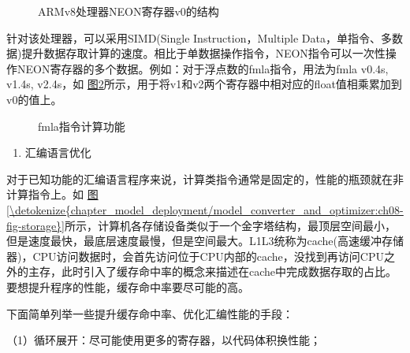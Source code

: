 \documentclass[letterpaper,10pt,english]{sphinxmanual}
\let\sphinxpxdimen\pdfpxdimen\else\newdimen\sphinxpxdimen
\begin{document}
\begin{figure}[H]
\centering
\capstart

\noindent\sphinxincludegraphics[width=500\sphinxpxdimen]{{register}.png}
\caption{ARMv8处理器NEON寄存器v0的结构}\label{\detokenize{chapter_model_deployment/model_inference:id10}}\label{\detokenize{chapter_model_deployment/model_inference:ch08-fig-register}}\end{figure}

\sphinxAtStartPar
针对该处理器，可以采用SIMD(Single Instruction，Multiple
Data，单指令、多数据)提升数据存取计算的速度。相比于单数据操作指令，NEON指令可以一次性操作NEON寄存器的多个数据。例如：对于浮点数的fmla指令，用法为fmla
v0.4s, v1.4s, v2.4s，如
\hyperref[\detokenize{chapter_model_deployment/model_inference:ch08-fig-fmla}]{图\ref{\detokenize{chapter_model_deployment/model_inference:ch08-fig-fmla}}}所示，用于将v1和v2两个寄存器中相对应的float值相乘累加到v0的值上。

\begin{figure}[H]
\centering
\capstart

\noindent\sphinxincludegraphics[width=600\sphinxpxdimen]{{fmla}.png}
\caption{fmla指令计算功能}\label{\detokenize{chapter_model_deployment/model_inference:id11}}\label{\detokenize{chapter_model_deployment/model_inference:ch08-fig-fmla}}\end{figure}
\begin{enumerate}
%
\setcounter{enumi}{2}
\item {} 
\sphinxAtStartPar
汇编语言优化

\end{enumerate}

\sphinxAtStartPar
对于已知功能的汇编语言程序来说，计算类指令通常是固定的，性能的瓶颈就在非计算指令上。如
\hyperref[\detokenize{chapter_model_deployment/model_converter_and_optimizer:ch08-fig-storage}]{图\ref{\detokenize{chapter_model_deployment/model_converter_and_optimizer:ch08-fig-storage}}}所示，计算机各存储设备类似于一个金字塔结构，最顶层空间最小，但是速度最快，最底层速度最慢，但是空间最大。L1\sphinxhyphen{}L3统称为cache(高速缓冲存储器)，CPU访问数据时，会首先访问位于CPU内部的cache，没找到再访问CPU之外的主存，此时引入了缓存命中率的概念来描述在cache中完成数据存取的占比。要想提升程序的性能，缓存命中率要尽可能的高。

\sphinxAtStartPar
下面简单列举一些提升缓存命中率、优化汇编性能的手段：

\sphinxAtStartPar
（1）循环展开：尽可能使用更多的寄存器，以代码体积换性能；
\end{document}
